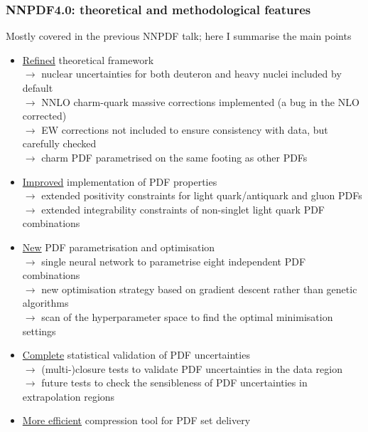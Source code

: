 \documentclass{beamer}
\begin{document}
\begin{frame}
 \frametitle{NNPDF4.0: theoretical and methodological features}
 \footnotesize
 \centering
 \begin{block}{}
  \centering
  Mostly covered in the previous NNPDF talk; here I summarise the main points\\
 \end{block}
 \begin{itemize}
  \item \underline{Refined} theoretical framework\\
  {\scriptsize $\rightarrow$ nuclear uncertainties for both deuteron and heavy nuclei included by default}\\
  {\scriptsize $\rightarrow$ NNLO charm-quark massive corrections implemented (a bug in the NLO corrected)}\\
  {\scriptsize $\rightarrow$ EW corrections not included to ensure consistency with data, but carefully checked}\\  
  {\scriptsize $\rightarrow$ charm PDF parametrised on the same footing as other PDFs}\\
  \item \underline{Improved} implementation of PDF properties\\
  {\scriptsize $\rightarrow$ extended positivity constraints for light quark/antiquark and gluon PDFs}\\
  {\scriptsize $\rightarrow$ extended integrability constraints of non-singlet light quark PDF combinations}\\
  \item \underline{New} PDF parametrisation and optimisation \\
  {\scriptsize $\rightarrow$ single neural network to parametrise eight independent PDF combinations}\\
  {\scriptsize $\rightarrow$ new optimisation strategy based on gradient descent rather than genetic algorithms}\\
  {\scriptsize $\rightarrow$ scan of the hyperparameter space to find the optimal minimisation settings}\\
  \item \underline{Complete} statistical validation of PDF uncertainties\\
  {\scriptsize $\rightarrow$ (multi-)closure tests to validate PDF uncertainties in the data region}\\
  {\scriptsize $\rightarrow$ future tests to check the sensibleness of PDF uncertainties in extrapolation regions}\\
  \item \underline{More efficient} compression tool for PDF set delivery 
 \end{itemize}
\end{frame}
\end{document}
